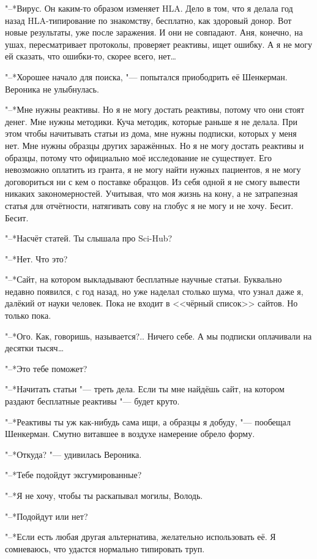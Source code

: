 "--*Вирус.
Он каким-то образом изменяет HLA.
Дело в том, что я делала год назад HLA-типирование по знакомству, бесплатно, как здоровый донор.
Вот новые результаты, уже после заражения.
И они не совпадают.
Аня, конечно, на ушах, пересматривает протоколы, проверяет реактивы, ищет ошибку.
А я не могу ей сказать, что ошибки-то, скорее всего, нет\ldots{}

"--*Хорошее начало для поиска, "--- попытался приободрить её Шенкерман.
Вероника не улыбнулась.

"--*Мне нужны реактивы.
Но я не могу достать реактивы, потому что они стоят денег.
Мне нужны методики.
Куча методик, которые раньше я не делала.
При этом чтобы начитывать статьи из дома, мне нужны подписки, которых у меня нет.
Мне нужны образцы других заражённых.
Но я не могу достать реактивы и образцы, потому что официально моё исследование не существует.
Его невозможно оплатить из гранта, я не могу найти нужных пациентов, я не могу договориться ни с кем о поставке образцов.
Из себя одной я не смогу вывести никаких закономерностей.
Учитывая, что моя жизнь на кону, а не затрапезная статья для отчётности, натягивать сову на глобус я не могу и не хочу.
Бесит.
Бесит.

"--*Насчёт статей.
Ты слышала про Sci-Hub?

"--*Нет.
Что это?

"--*Сайт, на котором выкладывают бесплатные научные статьи.
Буквально недавно появился, с год назад, но уже наделал столько шума, что узнал даже я, далёкий от науки человек.
Пока не входит в <<чёрный список>> сайтов.
Но только пока.

"--*Ого.
Как, говоришь, называется?..
Ничего себе.
А мы подписки оплачивали на десятки тысяч\ldots{}

"--*Это тебе поможет?

"--*Начитать статьи "--- треть дела.
Если ты мне найдёшь сайт, на котором раздают бесплатные реактивы "--- будет круто.

"--*Реактивы ты уж как-нибудь сама ищи, а образцы я добуду, "--- пообещал Шенкерман.
Смутно витавшее в воздухе намерение обрело форму.

"--*Откуда? "--- удивилась Вероника.

"--*Тебе подойдут эксгумированные?

"--*Я не хочу, чтобы ты раскапывал могилы, Володь.

"--*Подойдут или нет?

"--*Если есть любая другая альтернатива, желательно использовать её.
Я сомневаюсь, что удастся нормально типировать труп.


